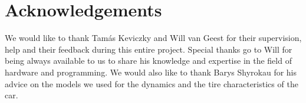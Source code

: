 \section{Acknowledgements}

We would like to thank Tam{\'a}s Keviczky and Will van Geest for their supervision, help and their feedback during this entire project. Special thanks go to Will for being always available to us to share his knowledge and expertise in the field of hardware and programming. We would also like to thank Barys Shyrokau for his advice on the models we used for the dynamics and the tire characteristics of the car.